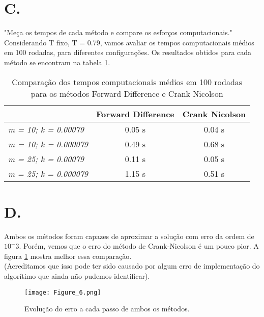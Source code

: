 \documentclass[11pt]{article}
\begin{document}
\section*{C.}

"Meça os tempos de cada método e compare os esforços computacionais."\\

Considerando T fixo, T = 0.79, vamos avaliar os tempos computacionais médios em 100 rodadas, para diferentes configurações. Os resultados obtidos para cada método se encontram na tabela \ref{tab_1}.

\begin{table}[H]
\centering
\begin{tabular}{l|c|c|}
\cline{2-3}
 & \textbf{Forward Difference} & \textbf{Crank Nicolson} \\ \hline
\multicolumn{1}{|l|}{\textit{m = 10; k = 0.00079}}  & 0.05 s                       & 0.04 s                   \\ \hline
\multicolumn{1}{|l|}{\textit{m = 10; k = 0.000079}} & 0.49 s                         & 0.68 s                   \\ \hline
\multicolumn{1}{|l|}{\textit{m = 25; k = 0.00079}}  & 0.11 s                       & 0.05 s                   \\ \hline
\multicolumn{1}{|l|}{\textit{m = 25; k = 0.000079}} & 1.15 s                       & 0.51 s                   \\ \hline
\end{tabular}
\caption{
Comparação dos tempos computacionais médios em 100 rodadas para os métodos Forward Difference e Crank Nicolson
}\label{tab_1}
\end{table}

\section*{D.}

Ambos os métodos foram capazes de aproximar a solução com erro da ordem de $10^-3$. Porém, vemos que o erro do método de Crank-Nicolson é um pouco pior. A figura \ref{fig_6} mostra melhor essa comparação.\\(Acreditamos que isso pode ter sido causado por algum erro de implementação do algorítimo que ainda não pudemos identificar).

\begin{figure}[H]
	\centering
	\texttt{[image: Figure\_6.png]}
	\caption{
Evolução do erro a cada passo de ambos os métodos.
	}
	\label{fig_6}
\end{figure}
\end{document}
